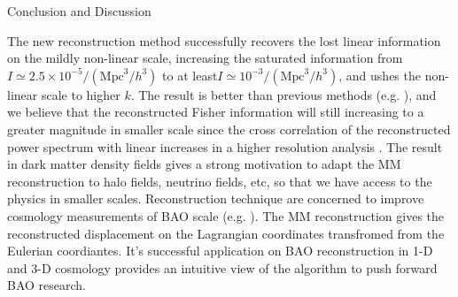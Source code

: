 \begin{section}{Conclusion and Discussion}
 \label{sec:conclusion}


   The new reconstruction method successfully recovers the lost linear information on 
the mildly non-linear scale, increasing the saturated information from 
$I \simeq 2.5 \times 10^{-5}/(\mathrm{Mpc}^3/h^3)$ to at least$I \simeq 10^{-3}/(\mathrm{Mpc}^3/h^3)$, 
and ushes the non-linear scale to higher $k$. 
The result is better than previous methods 
(e.g. \cite{bib:Mark2006,bib:Mark2009,bib:Zhang2011,bib:Yu2012,bib:Mark2014}), and
we believe that the reconstructed Fisher information will still increasing to a greater magnitude in smaller scale
since the cross correlation of the reconstructed power spectrum with linear increases                
in a higher resolution analysis \cite{bib:ZhuH2016}.
The result in dark matter density fields 
gives a strong motivation to adapt the MM reconstruction to halo fields, neutrino fields, etc, so that 
we have access to the physics in smaller scales. Reconstruction technique are concerned  
to improve cosmology measurements of BAO scale (e.g. \cite{bib:Daniel2007,bib:Martin2015}). 
The MM reconstruction gives the reconstructed displacement on the Lagrangian coordinates transfromed from the 
Eulerian coordiantes. It's successful application on BAO reconstruction in 1-D 
\cite{bib:Zhu2016} and 3-D \cite{bib:ZhuH2016} cosmology provides an intuitive view of the algorithm 
to push forward BAO research.


\end{section}

